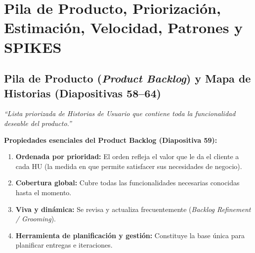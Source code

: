 
\chapter{Pila de Producto, Priorización, Estimación, Velocidad, Patrones y SPIKES}


\section{Pila de Producto (\textit{Product Backlog}) y Mapa de Historias (Diapositivas 58--64)}

\begin{definicion}
\textit{``Lista priorizada de Historias de Usuario que contiene toda la funcionalidad deseable del producto.''}
\end{definicion}

\textbf{Propiedades esenciales del Product Backlog (Diapositiva 59):}
\begin{enumerate}[label=\textbf{\arabic*.}, itemsep=2pt]
    \item \textbf{Ordenada por prioridad:} El orden refleja el valor que le da el cliente a cada HU (la medida en que permite satisfacer sus necesidades de negocio).
    \item \textbf{Cobertura global:} Cubre todas las funcionalidades necesarias conocidas hasta el momento.
    \item \textbf{Viva y dinámica:} Se revisa y actualiza frecuentemente (\textit{Backlog Refinement / Grooming}).
    \item \textbf{Herramienta de planificación y gestión:} Constituye la base única para planificar entregas e iteraciones.
\end{enumerate}

